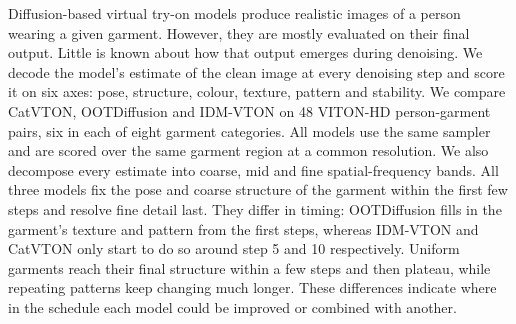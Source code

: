 Diffusion-based virtual try-on models produce realistic images of a person wearing a given garment. However, they are mostly evaluated on their final output. Little is known about how that output emerges during denoising. We decode the model's estimate of the clean image at every denoising step and score it on six axes: pose, structure, colour, texture, pattern and stability. We compare CatVTON, OOTDiffusion and IDM-VTON on 48 VITON-HD person-garment pairs, six in each of eight garment categories. All models use the same sampler and are scored over the same garment region at a common resolution. We also decompose every estimate into coarse, mid and fine spatial-frequency bands. All three models fix the pose and coarse structure of the garment within the first few steps and resolve fine detail last. They differ in timing: OOTDiffusion fills in the garment's texture and pattern from the first steps, whereas IDM-VTON and CatVTON only start to do so around step 5 and 10 respectively. Uniform garments reach their final structure within a few steps and then plateau, while repeating patterns keep changing much longer. These differences indicate where in the schedule each model could be improved or combined with another.

